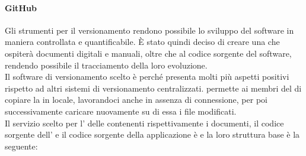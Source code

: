 \paragraph{GitHub}
Gli strumenti per il versionamento rendono possibile lo sviluppo del software in maniera controllata e quantificabile. È stato quindi deciso di creare una  che ospiterà documenti digitali e manuali, oltre che al codice sorgente del software, rendendo possibile il tracciamento della loro evoluzione. \\
Il software di versionamento scelto è  perché presenta molti più aspetti positivi rispetto ad altri sistemi di versionamento centralizzati.  permette ai membri del  di copiare la  in locale, lavorandoci anche in assenza di connessione, per poi successivamente caricare nuovamente su di essa i file modificati. \\
Il servizio scelto per l' delle  contenenti rispettivamente i documenti, il codice sorgente dell' e il codice sorgente della applicazione  è  e la loro struttura base è la seguente:
